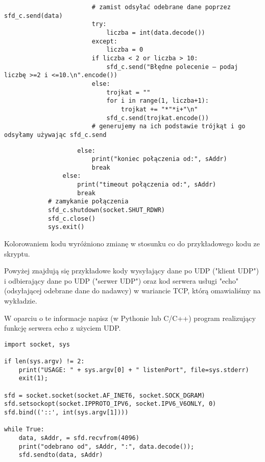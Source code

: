 \begin{verbatim}
                        # zamist odsyłać odebrane dane poprzez sfd_c.send(data)
                        try:
                            liczba = int(data.decode())
                        except:
                            liczba = 0
                        if liczba < 2 or liczba > 10:
                            sfd_c.send("Błędne polecenie – podaj liczbę >=2 i <=10.\n".encode())
                        else:
                            trojkat = ""
                            for i in range(1, liczba+1):
                                trojkat += "*"*i+"\n"
                            sfd_c.send(trojkat.encode())
                        # generujemy na ich podstawie trójkąt i go odsyłamy używając sfd_c.send
\end{verbatim}
\begin{Verbatim}
                    else:
                        print("koniec połączenia od:", sAddr)
                        break
                else:
                    print("timeout połączenia od:", sAddr)
                    break
            # zamykanie połączenia
            sfd_c.shutdown(socket.SHUT_RDWR)
            sfd_c.close()
            sys.exit()
\end{Verbatim}
Kolorowaniem kodu wyróżniono zmianę w stosunku co do przykładowego kodu ze skryptu.
\fi


\dbEntryCheckResults
Powyżej znajdują się przykładowe kody wysyłający dane po UDP ("klient UDP") i odbierający dane po UDP ("serwer UDP")
oraz kod serwera usługi "echo" (odsyłającej odebrane dane do nadawcy) w wariancie TCP, którą omawialiśmy na wykładzie.

W oparciu o te informacje napisz (w Pythonie lub C/C++) program realizujący funkcję serwera echo z użyciem UDP.
\fi

\dbEntryCheckResults
\begin{verbatim}
import socket, sys

if len(sys.argv) != 2:
    print("USAGE: " + sys.argv[0] + " listenPort", file=sys.stderr)
    exit(1);

sfd = socket.socket(socket.AF_INET6, socket.SOCK_DGRAM)
sfd.setsockopt(socket.IPPROTO_IPV6, socket.IPV6_V6ONLY, 0)
sfd.bind(('::', int(sys.argv[1])))

while True:
    data, sAddr, = sfd.recvfrom(4096)
    print("odebrano od", sAddr, ":", data.decode());
    sfd.sendto(data, sAddr)
\end{verbatim}
\fi

